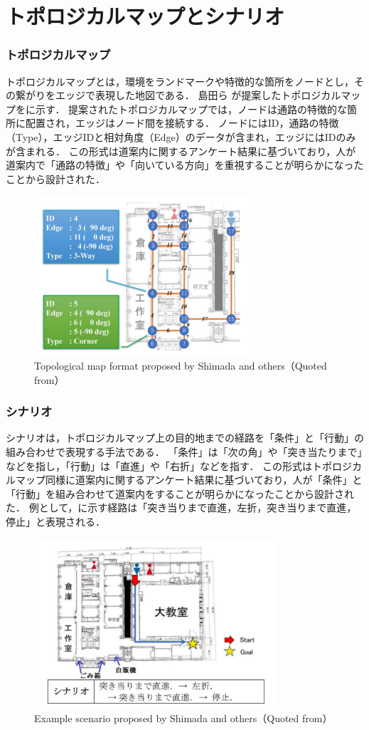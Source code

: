 \section{トポロジカルマップとシナリオ}
\subsubsection{トポロジカルマップ}
トポロジカルマップとは，環境をランドマークや特徴的な箇所をノードとし，その繋がりをエッジで表現した地図である．
島田ら \cite{shimada2020}が提案したトポロジカルマップをに示す．
提案されたトポロジカルマップでは，ノードは通路の特徴的な箇所に配置され，エッジはノード間を接続する．
ノードにはID，通路の特徴（Type），エッジIDと相対角度（Edge）のデータが含まれ，エッジにはIDのみが含まれる．
この形式は道案内に関するアンケート結果に基づいており，人が道案内で「通路の特徴」や「向いている方向」を重視することが明らかになったことから設計された．

\begin{figure}[htbp]
  \centering
   \includegraphics[width=80mm]{images/pdf/shimada/topo.pdf}
   \caption[Topological map format proposed by Shimada and others]{Topological map format proposed by Shimada and others（Quoted from\cite{shimada2020}）}
   \label{fig:shimada_topo}
\end{figure}

\clearpage
\subsubsection{シナリオ}
シナリオは，トポロジカルマップ上の目的地までの経路を「条件」と「行動」の組み合わせで表現する手法である．
「条件」は「次の角」や「突き当たりまで」などを指し，「行動」は「直進」や「右折」などを指す．
この形式はトポロジカルマップ同様に道案内に関するアンケート結果に基づいており，人が「条件」と「行動」を組み合わせて道案内をすることが明らかになったことから設計された．
例として，に示す経路は「突き当りまで直進，左折，突き当りまで直進，停止」と表現される．

\begin{figure}[htbp]
  \centering
   \includegraphics[width=90mm]{images/pdf/shimada/scenario.pdf}
   \caption[Example scenario proposed by Shimada and others]{Example scenario proposed by Shimada and others（Quoted from\cite{shimada2020}）}
   \label{fig:shimada_scenario}
\end{figure}